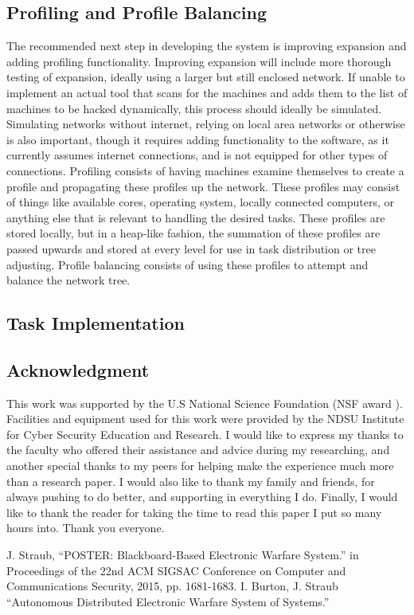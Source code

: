 \subsection{Profiling and Profile Balancing}
The recommended next step in developing the system is improving expansion and adding profiling functionality. Improving expansion will include more thorough testing of expansion, ideally using a larger but still enclosed network. If unable to implement an actual tool that scans for the machines and adds them to the list of machines to be hacked dynamically, this process should ideally be simulated. Simulating networks without internet, relying on local area networks or otherwise is also important, though it requires adding functionality to the software, as it currently assumes internet connections, and is not equipped for other types of connections. Profiling consists of having machines examine themselves to create a profile and propagating these profiles up the network. These profiles may consist of things like available cores, operating system, locally connected computers, or anything else that is relevant to handling the desired tasks. These profiles are stored locally, but in a heap-like fashion, the summation of these profiles are passed upwards and stored at every level for use in task distribution or tree adjusting. Profile balancing consists of using these profiles to attempt and balance the network tree.
\subsection{Task Implementation}
\subsection*{Acknowledgment}
This work was supported by the U.S National Science Foundation (NSF award ). Facilities and equipment used for this work were provided by the NDSU Institute for Cyber Security Education and Research. I would like to express my thanks to the faculty who offered their assistance and advice during my researching, and another special thanks to my peers for helping make the experience much more than a research paper. I would also like to thank my family and friends, for always pushing to do better, and supporting in everything I do. Finally, I would like to thank the reader for taking the time to read this paper I put so many hours into. Thank you everyone.

\begin{thebibliography}{9}
J. Straub, ``POSTER: Blackboard-Based Electronic Warfare System.''	in Proceedings of the 22nd ACM SIGSAC Conference on Computer and Communications Security, 2015, pp. 1681-1683.
I. Burton, J. Straub ``Autonomous Distributed Electronic Warfare System of Systems.''

\end{thebibliography}





